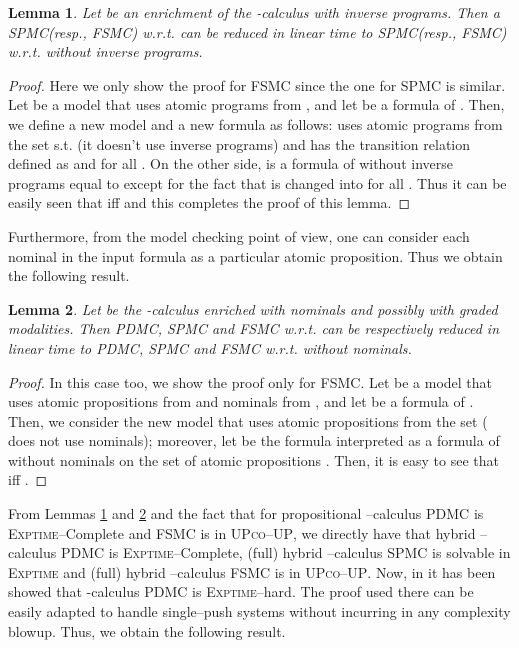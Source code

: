 \documentclass{LMCS}
\theoremstyle{plain}
\def \coUP          {\textsc{co--UP}\xspace}
\def \EXPTIME       {\textsc{Exptime}\xspace}
\def \FSMC          {\textsc{FSMC}\xspace}
\def \PDMC          {\textsc{PDMC}\xspace}
\def \SPMC          {\textsc{SPMC}\xspace}
\def \UP            {{\sc UP}}
\def \UP            {\textsc{UP}\xspace}
\newtheorem{lemma}{Lemma}
\begin{document}
\begin{lemma}\label{lem:RemovingInversePrograms}
Let  be an enrichment of the -calculus with inverse programs.
Then a \SPMC (resp., \FSMC) w.r.t.  can be reduced in linear time to
\SPMC (resp., \FSMC) w.r.t.  without inverse programs.
\end{lemma}

\begin{proof}
Here we only show the proof for \FSMC since the one for \SPMC is similar. Let
 be a model that uses atomic programs from
, and let  be a formula of . Then, we define a new
model  and a new formula  as follows:  uses atomic programs from the set  s.t.
 (it doesn't use inverse programs) and has the transition
relation defined as  and  for all . On the other side,  is a formula of  without inverse
programs equal to  except for the fact that  is changed into
 for all . Thus it can be easily seen that  iff  and this completes the proof of this lemma.
\end{proof}

Furthermore, from the model checking point of view, one can consider each
nominal in the input formula as a particular atomic proposition. Thus we obtain
the following result.

\begin{lemma}\label{lem:RemovingNominals}
Let  be the -calculus enriched with nominals and possibly with
graded modalities. Then \PDMC, \SPMC and \FSMC w.r.t.  can be
respectively reduced in linear time to \PDMC, \SPMC and \FSMC w.r.t. 
without nominals.
\end{lemma}

\begin{proof}
In this case too, we show the proof only for \FSMC. Let  be a model that uses atomic propositions from  and nominals
from , and let  be a formula of . Then, we consider the
new model  that uses atomic propositions
from the set  ( does not use nominals); moreover, let
 be the formula  interpreted as a formula of 
without nominals on the set of atomic propositions . Then, it is easy to
see that  iff .
\end{proof}

From Lemmas \ref{lem:RemovingInversePrograms} and \ref{lem:RemovingNominals}
and the fact that for propositional --calculus \PDMC is \EXPTIME--Complete
\cite{Wal96} and \FSMC is in \UP  \coUP \cite{Wil01}, we directly have
that hybrid --calculus \PDMC is \EXPTIME--Complete, (full) hybrid
--calculus \SPMC is solvable in \EXPTIME and (full) hybrid --calculus
\FSMC is in \UP  \coUP. Now, in \cite{Wal96} it has been showed that
-calculus \PDMC is \EXPTIME--hard. The proof used there can be easily
adapted to handle single--push systems without incurring in any complexity
blowup. Thus, we obtain the following result.
\end{document}
